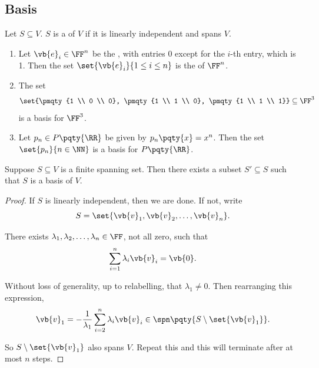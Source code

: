 \subsection{Basis}

\begin{definition}[Basis]
    Let \(S \subseteq V\). \(S\) is a  of \(V\) if it is linearly independent and spans \(V\).
\end{definition}

\begin{examples}
    \begin{enumerate}
        \item Let \(\vb{e}_i \in \FF^n\) be the , with entries 0 except for the \(i\)-th entry, which is 1. Then the set \(\set{\vb{e}_i}{1 \leq i \leq n}\) is the  of \(\FF^n\).
        \item The set
        \[
            \set{\pmqty{1 \\ 0 \\ 0}, \pmqty{1 \\ 1 \\ 0}, \pmqty{1 \\ 1 \\ 1}} \subseteq \FF^3
        \]
        is a basis for \(\FF^3\).
        \item Let \(p_n \in P\pqty{\RR}\) be given by \(p_n\pqty{x} = x^n\). Then the set \(\set{p_n}{n \in \NN}\) is a basis for \(P\pqty{\RR}\).
    \end{enumerate}
\end{examples}

\begin{proposition}
    \label{prop:spanning-set-reduces-to-basis}%
    Suppose \(S \subseteq V\) is a finite spanning set. Then there exists a subset \(S' \subseteq S\) such that \(S\) is a basis of \(V\).
\end{proposition}

\begin{proof}
    If \(S\) is linearly independent, then we are done. If not, write
    \[
        S = \set{\vb{v}_1, \vb{v}_2, \ldots, \vb{v}_n}.
    \]

    There exists \(\lambda_1, \lambda_2, \ldots, \lambda_n \in \FF\), not all zero, such that
    \[
        \sum_{i = 1}^{n} \lambda_i \vb{v}_i = \vb{0}.
    \]

    Without loss of generality, up to relabelling, that \(\lambda_1 \neq 0\). Then rearranging this expression,
    \[
        \vb{v}_1 = - \frac{1}{\lambda_1} \sum_{i = 2}^{n} \lambda_i \vb{v}_i \in \spn\pqty{S \setminus \set{\vb{v}_1}}.
    \]

    So \(S \setminus \set{\vb{v}_1}\) also spans \(V\). Repeat this and this will terminate after at most \(n\) steps.
\end{proof}

